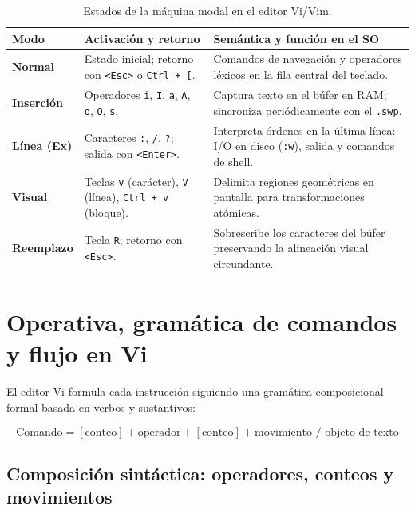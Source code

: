 \documentclass[12pt]{article}
\begin{document}
\begin{table}[htbp]
\centering
\footnotesize
\renewcommand{\arraystretch}{1.08}
\renewcommand{\tabularxcolumn}[1]{m{#1}}
\setlength{\emergencystretch}{1.5em}
\caption{Estados de la máquina modal en el editor Vi/Vim.}
\label{tab:modosEjecucionVi}
\begin{tabularx}{\textwidth}{>{\centering\arraybackslash}m{2.8cm} X X}
\toprule
\textbf{Modo} & \textbf{Activación y retorno} & \textbf{Semántica y función en el SO} \\
\midrule
\textbf{Normal} & Estado inicial; retorno con \texttt{<Esc>} o \texttt{Ctrl + [}. & Comandos de navegación y operadores léxicos en la fila central del teclado. \\
\addlinespace
\textbf{Inserción} & Operadores \texttt{i}, \texttt{I}, \texttt{a}, \texttt{A}, \texttt{o}, \texttt{O}, \texttt{s}. & Captura texto en el búfer en RAM; sincroniza periódicamente con el \texttt{.swp}. \\
\addlinespace
\textbf{Línea (Ex)} & Caracteres \texttt{:}, \texttt{/}, \texttt{?}; salida con \texttt{<Enter>}. & Interpreta órdenes en la última línea: I/O en disco (\texttt{:w}), salida y comandos de shell. \\
\addlinespace
\textbf{Visual} & Teclas \texttt{v} (carácter), \texttt{V} (línea), \texttt{Ctrl + v} (bloque). & Delimita regiones geométricas en pantalla para transformaciones atómicas. \\
\addlinespace
\textbf{Reemplazo} & Tecla \texttt{R}; retorno con \texttt{<Esc>}. & Sobrescribe los caracteres del búfer preservando la alineación visual circundante. \\
\bottomrule
\end{tabularx}
\end{table}

\section{Operativa, gramática de comandos y flujo en Vi}
\label{sec:operativaGramaticaVi}

El editor Vi formula cada instrucción siguiendo una gramática composicional formal basada en verbos y sustantivos:

\begin{equation}
\label{eq:gramaticaVi}
\text{Comando} = [\text{conteo}] + \text{operador} + [\text{conteo}] + \text{movimiento / objeto de texto}
\end{equation}

\subsection{Composición sintáctica: operadores, conteos y movimientos}
\label{subsec:composicionSintacticaVi}
\end{document}
